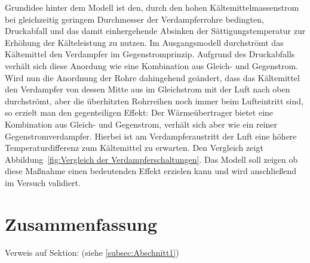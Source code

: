 Grundidee hinter dem Modell ist den, durch den hohen Kältemittelmassenstrom bei gleichzeitig geringem Durchmesser der Verdampferrohre bedingten, Druckabfall und das damit einhergehende Absinken der Sättigungstemperatur zur Erhöhung der Kälteleistung zu nutzen. Im Ausgangsmodell durchströmt das Kältemittel den Verdampfer im Gegenstromprinzip. Aufgrund des Druckabfalls verhält sich diese Anordung wie eine Kombination aus Gleich- und Gegenstrom. Wird nun die Anordnung der Rohre dahingehend geändert, dass das Kältemittel den Verdampfer von dessen Mitte aus im Gleichstrom mit der Luft nach oben durchströmt, aber die überhitzten Rohrreihen noch immer beim Lufteintritt sind, so erzielt man den gegenteiligen Effekt: Der Wärmeübertrager bietet eine Kombination aus Gleich- und Gegenstrom, verhält sich aber wie ein reiner Gegenstromverdampfer. Hierbei ist am Verdampferaustritt der Luft eine höhere Temperaturdifferenz zum Kältemittel zu erwarten. Den Vergleich zeigt Abbildung~\ref{fig:Vergleich der Verdampferschaltungen}.
Das Modell soll zeigen ob diese Maßnahme einen bedeutenden Effekt erzielen kann und wird anschließend im Versuch validiert.





\chapter{Zusammenfassung}
\label{cha:Zusammenfassung}
Verweis auf Sektion: (siehe \ref{subsec:Abschnitt1})